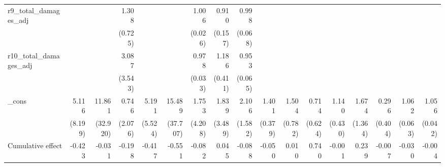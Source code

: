 \begin{table}[htbp]
\begin{tabular}{l*{16}{D{.}{.}{-1}}}
r9\_total\_damages\_adj&                     &                     &       1.308         &                     &                     &       1.006         &       0.910         &       0.998         &                     &                     &                     &                     &                     &                     &                     &                     \\
                    &                     &                     &     (0.725)         &                     &                     &     (0.026)         &     (0.157)         &     (0.068)         &                     &                     &                     &                     &                     &                     &                     &                     \\
r10\_total\_damages\_adj&                     &                     &       3.087         &                     &                     &       0.978         &       1.186         &       0.953         &                     &                     &                     &                     &                     &                     &                     &                     \\
                    &                     &                     &     (3.543)         &                     &                     &     (0.033)         &     (0.411)         &     (0.065)         &                     &                     &                     &                     &                     &                     &                     &                     \\
\_cons              &       5.116         &      11.861         &       0.746         &       5.191\sym{\%}  &      15.489         &       1.753         &       1.839         &       2.106         &       1.401         &       1.504         &       0.714         &       1.140         &       1.674         &       0.296         &       1.062         &       1.056         \\
                    &     (8.199)         &    (32.920)         &     (2.076)         &     (5.524)         &    (37.707)         &     (4.208)         &     (3.489)         &     (1.582)         &     (0.379)         &     (0.782)         &     (0.624)         &     (0.430)         &     (1.364)         &     (0.404)         &     (0.063)         &     (0.042)         \\
\midrule
Cumulative effect   &      -0.423         &      -0.031         &      -0.198         &      -0.417         &      -0.551         &      -0.082         &       0.045         &      -0.088         &      -0.050         &       0.010         &       0.740         &      -0.001         &       0.239         &      -0.007         &      -0.030         &      -0.004         \\

\end{tabular}
\end{table}
